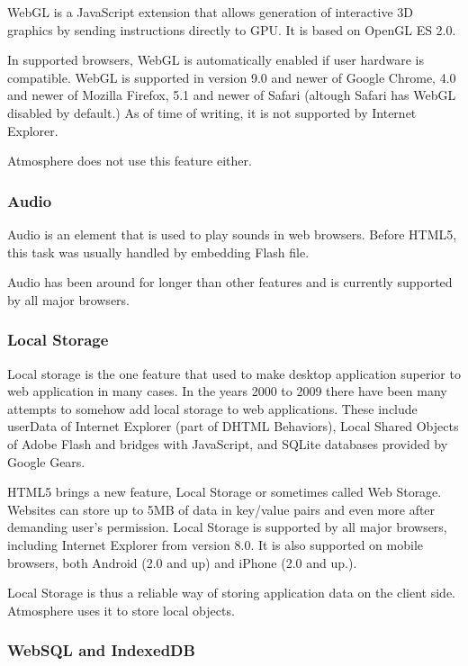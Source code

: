 WebGL is a JavaScript extension that allows generation of interactive 3D graphics by sending instructions directly to GPU. It is based on OpenGL ES 2.0. 

In supported browsers, WebGL is automatically enabled if user hardware is compatible. WebGL is  supported in version 9.0 and newer of Google Chrome, 4.0 and newer of Mozilla Firefox, 5.1 and newer of Safari (altough Safari has WebGL disabled by default.) As of time of writing, it is not supported by Internet Explorer. 

Atmosphere does not use this feature either.

\subsubsection{Audio}

Audio is an element that is used to play sounds in web browsers. Before HTML5, this task was usually handled by embedding Flash file. 

Audio has been around for longer than other features and is currently supported by all major browsers.

\subsubsection{Local Storage}

Local storage is the one feature that used to make desktop application superior to web application in many cases. In the years 2000 to 2009 there have been many attempts to somehow add local storage to web applications. These include userData of Internet Explorer (part of DHTML Behaviors), Local Shared Objects of Adobe Flash and bridges with JavaScript, and SQLite databases provided by Google Gears.

HTML5 brings a new feature, Local Storage or sometimes called Web Storage. Websites can store up to 5MB of data in key/value pairs and even more after demanding user's permission. Local Storage is supported by all major browsers, including Internet Explorer from version 8.0. It is also supported on mobile browsers, both Android (2.0 and up) and iPhone (2.0 and up.). 

Local Storage is thus a reliable way of storing application data on the client side. Atmosphere uses it to store local objects. 

\subsubsection{WebSQL and IndexedDB}


